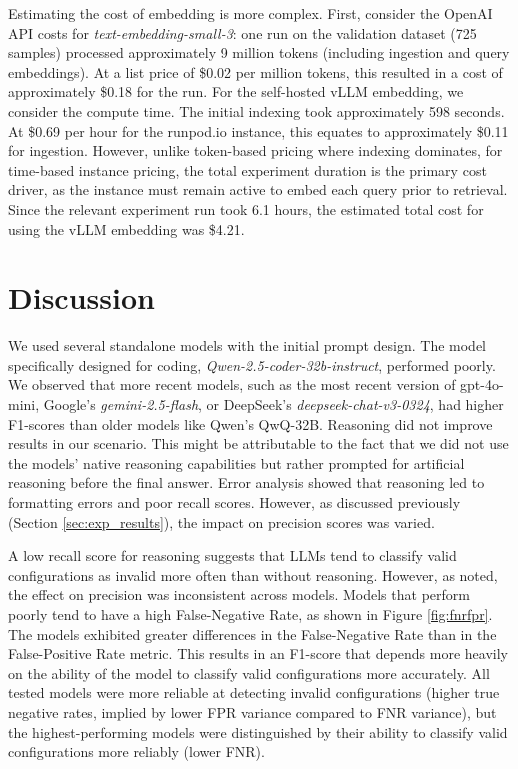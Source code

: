 Estimating the cost of embedding is more complex. First, consider the OpenAI API costs for \textit{text-embedding-small-3}: one run on the validation dataset (725 samples) processed approximately 9 million tokens (including ingestion and query embeddings). At a list price of \$0.02 per million tokens, this resulted in a cost of approximately \$0.18 for the run. For the self-hosted vLLM embedding, we consider the compute time. The initial indexing took approximately 598 seconds. At \$0.69 per hour for the runpod.io instance, this equates to approximately \$0.11 for ingestion. However, unlike token-based pricing where indexing dominates, for time-based instance pricing, the total experiment duration is the primary cost driver, as the instance must remain active to embed each query prior to retrieval. Since the relevant experiment run took 6.1 hours, the estimated total cost for using the vLLM embedding was \$4.21.




\section{Discussion} \label{sec:exp_discussion}

We used several standalone models with the initial prompt design. The model specifically designed for coding, \textit{Qwen-2.5-coder-32b-instruct}, performed poorly. We observed that more recent models, such as the most recent version of gpt-4o-mini, Google's \textit{gemini-2.5-flash}, or DeepSeek's \textit{deepseek-chat-v3-0324}, had higher F1-scores than older models like Qwen's QwQ-32B. Reasoning did not improve results in our scenario. This might be attributable to the fact that we did not use the models' native reasoning capabilities but rather prompted for artificial reasoning before the final answer. Error analysis showed that reasoning led to formatting errors and poor recall scores. However, as discussed previously (Section \ref{sec:exp_results}), the impact on precision scores was varied.

A low recall score for reasoning suggests that LLMs tend to classify valid configurations as invalid more often than without reasoning. However, as noted, the effect on precision was inconsistent across models. Models that perform poorly tend to have a high False-Negative Rate, as shown in Figure \ref{fig:fnrfpr}. The models exhibited greater differences in the False-Negative Rate than in the False-Positive Rate metric. This results in an F1-score that depends more heavily on the ability of the model to classify valid configurations more accurately. All tested models were more reliable at detecting invalid configurations (higher true negative rates, implied by lower FPR variance compared to FNR variance), but the highest-performing models were distinguished by their ability to classify valid configurations more reliably (lower FNR).

